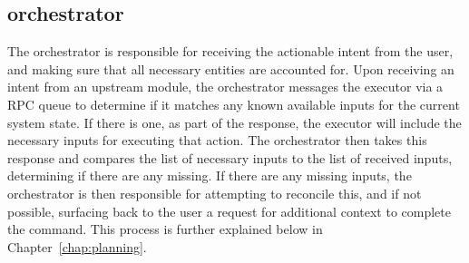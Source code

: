 \subsection{orchestrator}

The orchestrator is responsible for receiving the actionable intent from the user, 
and making sure that all necessary entities are accounted for. Upon receiving an 
intent from an upstream module, the orchestrator messages the executor via a RPC 
queue to determine if it
matches any known available inputs for the current system state. If there is one,
as part of the response, the executor will include the necessary inputs for
executing that action. The orchestrator
then takes this response and compares the list of necessary inputs to the list of 
received inputs, determining if there are any missing. If there are any missing 
inputs, the orchestrator is then responsible for attempting to reconcile this,
and if not possible, surfacing back to the user a request for additional context
to complete the command. This process is further explained below in  
Chapter~\ref{chap:planning}.
